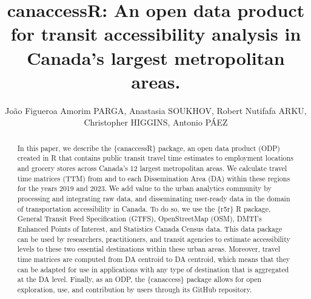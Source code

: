 \documentclass[Royal,times,sageh]{sagej}
\begin{document}

\title{canaccessR: An open data product for transit accessibility
analysis in Canada's largest metropolitan areas.}

\runninghead{}

\author{João Figueroa Amorim PARGA\affilnum{}, Anastasia
SOUKHOV\affilnum{}, Robert Nutifafa ARKU\affilnum{}, Christopher
HIGGINS\affilnum{}, Antonio PÁEZ\affilnum{}}

\affiliation{}



\begin{abstract}
In this paper, we describe the \{canaccessR\} package, an open data
product (ODP) created in R that contains public transit travel time
estimates to employment locations and grocery stores across Canada's 12
largest metropolitan areas. We calculate travel time matrices (TTM) from
and to each Dissemination Area (DA) within these regions for the years
2019 and 2023. We add value to the urban analytics community by
processing and integrating raw data, and disseminating user-ready data
in the domain of transportation accessibility in Canada. To do so, we
use the \{r5r\} R package, General Transit Feed Specification (GTFS),
OpenStreetMap (OSM), DMTI's Enhanced Points of Interest, and Statistics
Canada Census data. This data package can be used by researchers,
practitioners, and transit agencies to estimate accessibility levels to
these two essential destinations within these urban areas. Moreover,
travel time matrices are computed from DA centroid to DA centroid, which
means that they can be adapted for use in applications with any type of
destination that is aggregated at the DA level. Finally, as an ODP, the
\{canaccess\} package allows for open exploration, use, and contribution
by users through its GitHub repository.
\end{abstract}


\maketitle





\end{document}
